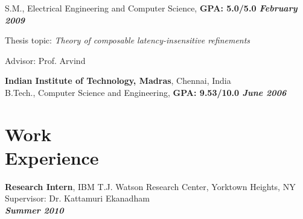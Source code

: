 \documentclass[margin,line]{resume}
\begin{document}
\begin{resume}
\begin{list2}
    \end{list2}\vspace{-3mm}
    S.M., Electrical Engineering and Computer Science, \hfill \textbf{GPA: 5.0/5.0 \textit{February 2009}}\\
    \vspace{-3mm}
    \begin{list2}
        \item Thesis topic: \textit{Theory of composable latency-insensitive refinements}
        \item Advisor:  Prof. Arvind
    \end{list2}\vspace{-3mm}
    \textbf{Indian Institute of Technology, Madras}, Chennai, India\\
    B.Tech., Computer Science and Engineering, \hfill \textbf{GPA: 9.53/10.0 \textit{June 2006}}\\
    \vspace{-7mm}


    \section{\mysidestyle Work\\Experience}

    \textbf{Research Intern}, IBM T.J. Watson Research Center, Yorktown Heights, NY\\ 
    Supervisor: Dr. Kattamuri Ekanadham \\
\hfill \textbf{\textit{Summer 2010}}\\


\end{resume}
\end{document}
